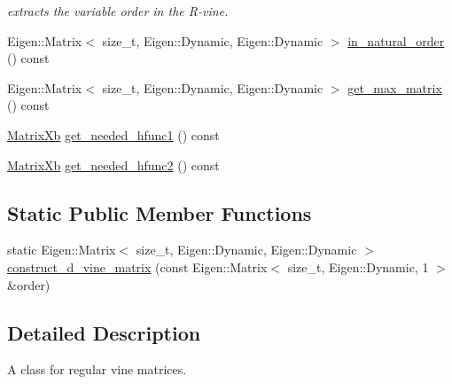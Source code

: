 \begin{DoxyCompactItemize}
\begin{DoxyCompactList}\small\item\em extracts the variable order in the R-\/vine. \end{DoxyCompactList}\item 
Eigen\+::\+Matrix$<$ size\+\_\+t, Eigen\+::\+Dynamic, Eigen\+::\+Dynamic $>$ \hyperlink{classvinecopulib_1_1_r_vine_matrix_a4e63d8b01e1d89284ca28192676b8a3f}{in\+\_\+natural\+\_\+order} () const 
\item 
Eigen\+::\+Matrix$<$ size\+\_\+t, Eigen\+::\+Dynamic, Eigen\+::\+Dynamic $>$ \hyperlink{classvinecopulib_1_1_r_vine_matrix_aef8bbe14451d023e1c9c113e3812f574}{get\+\_\+max\+\_\+matrix} () const 
\item 
\hyperlink{namespacevinecopulib_1_1tools__eigen_a2fcd63009df35741859f44f1e41931f9}{Matrix\+Xb} \hyperlink{classvinecopulib_1_1_r_vine_matrix_a6303fc1f643fdf793c867ca7e08e42bc}{get\+\_\+needed\+\_\+hfunc1} () const 
\item 
\hyperlink{namespacevinecopulib_1_1tools__eigen_a2fcd63009df35741859f44f1e41931f9}{Matrix\+Xb} \hyperlink{classvinecopulib_1_1_r_vine_matrix_a7ac32cf10a966ba567142e9b36106746}{get\+\_\+needed\+\_\+hfunc2} () const 
\end{DoxyCompactItemize}
\subsection*{Static Public Member Functions}
\begin{DoxyCompactItemize}
\item 
static Eigen\+::\+Matrix$<$ size\+\_\+t, Eigen\+::\+Dynamic, Eigen\+::\+Dynamic $>$ \hyperlink{classvinecopulib_1_1_r_vine_matrix_ad523b84e2ea41eba4eb982eb9b39471b}{construct\+\_\+d\+\_\+vine\+\_\+matrix} (const Eigen\+::\+Matrix$<$ size\+\_\+t, Eigen\+::\+Dynamic, 1 $>$ \&order)
\end{DoxyCompactItemize}


\subsection{Detailed Description}
A class for regular vine matrices. 

